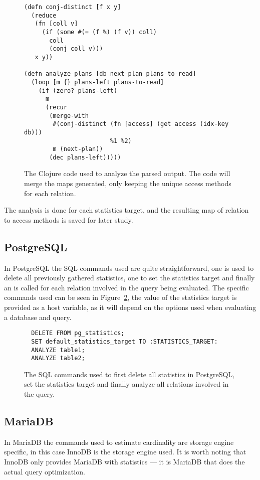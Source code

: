 \begin{figure}[ht]
\begin{verbatim}
(defn conj-distinct [f x y]
  (reduce
   (fn [coll v]
     (if (some #(= (f %) (f v)) coll)
       coll
       (conj coll v)))
   x y))

(defn analyze-plans [db next-plan plans-to-read]
  (loop [m {} plans-left plans-to-read]
    (if (zero? plans-left)
      m
      (recur
       (merge-with
        #(conj-distinct (fn [access] (get access (idx-key db)))
                        %1 %2)
        m (next-plan))
       (dec plans-left)))))
   \end{verbatim}
   \caption[The Clojure code to analyze a query]{The Clojure code used to
     analyze the parsed output. The code will merge the maps generated, only
     keeping the unique access methods for each relation.}
\label{fig:clj:analyzing}
\end{figure}

The analysis is done for each statistics target, and the resulting map of relation to
access methods is saved for later study.

\subsection{PostgreSQL}\label{sec:postgresql}
In PostgreSQL the SQL commands used are quite straightforward, one is used to
delete all previously gathered statistics, one to set the statistics target and
finally an  is called for each relation involved in the query being
evaluated. The specific commands used can be seen in
Figure~\ref{fig:sql:pganalyze}, the value of the statistics target is provided as a
host variable, as it will depend on the options used when evaluating a database
and query.

\begin{figure}[ht]
\begin{verbatim}
  DELETE FROM pg_statistics;
  SET default_statistics_target TO :STATISTICS_TARGET:
  ANALYZE table1;
  ANALYZE table2;
\end{verbatim}
\caption[Generating new cardinality estimates in PostgreSQL.]{The SQL commands
  used to first delete all statistics in PostgreSQL, set the statistics target
  and finally analyze all relations involved in the query.}
\label{fig:sql:pganalyze}
\end{figure}

\subsection{MariaDB}\label{sec:mariadb}
In MariaDB the commands used to estimate cardinality are storage engine specific,
in this case InnoDB is the storage engine used. It is worth noting that InnoDB only
provides MariaDB with statistics --- it is MariaDB that does the actual
query optimization.

